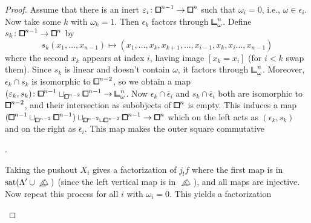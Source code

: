 \begin{proof}
Assume that there is an inert $\epsilon_i\colon{\bbox}^{n-1}\to{\bbox}^n$ such that $\omega_i = 0$,
i.e., $\omega\in\epsilon_i$.
Now take some $k$ with $\omega_k = 1$.
Then $\epsilon_k$ factors through ${\bbcor}^n_\omega$.
Define $s_k\colon{\bbox}^{n-1}\to{\bbox}^n$ by
\[
    s_k(x_1,\ldots,x_{n-1})\mapsto (x_1,\ldots,x_k,x_{k+1},\dots,x_{i-1}, x_k, x_{i}\ldots,x_{n-1})
\]
where the second $x_k$ appears at index $i$, having image $[x_k=x_i]$ (for $i<k$ swap them).
Since $s_k$ is linear and doesn't contain $\omega$, it factors through ${\bbcor}^n_\omega$.
Moreover, $\epsilon_k\cap s_k$ is isomorphic to ${\bbox}^{n-2}$,
so we obtain a map $(\epsilon_k,s_k)\colon{\bbox}^{n-1}\sqcup_{{\bbox}^{n-2}}{\bbox}^{n-1}\to{\bbcor}^n_\omega$.
Now $\epsilon_k\cap\overline{\epsilon}_i$ and $s_k\cap\overline{\epsilon}_i$ both are isomorphic to ${\bbox}^{n-2}$,
and their intersection as subobjects of ${\bbox}^n$ is empty.
This induces a map $({\bbox}^{n-1}\sqcup_{{\bbox}^{n-2}}{\bbox}^{n-1})\sqcup_{{\bbox}^{n-2}\sqcup{\bbox}^{n-2}}{\bbox}^{n-1}\to{\bbox}^n$
which on the left acts as $(\epsilon_k,s_k)$ and on the right as $\overline{\epsilon}_i$.
This map makes the outer square commutative
\begin{center}
.
\end{center}
Taking the pushout $X_i$ gives a factorization of $j_!f$ where the first map
is in $\mathrm{sat}(\Lambda'\cup\bprism)$ (since the left vertical map is in $\bprism$),
and all maps are injective.
Now repeat this process for all $i$ with $\omega_i=0$.
This yields a factorization
\begin{center}
\end{center}
\end{proof}
